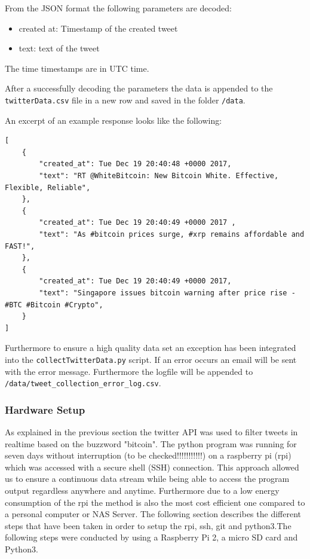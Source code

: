 \documentclass[a4paper,12pt]{article}
\begin{document}
\begin{spacing}{1.2}
From the JSON format the following parameters are decoded:
\begin{itemize}
    \item created at: Timestamp of the created tweet
    \item text: text of the tweet
\end{itemize}
The time timestamps are in UTC time.

After a successfully decoding the parameters the data is appended to the \verb|twitterData.csv| file in a new row and saved in the folder \verb|/data|.

An excerpt of an example response looks like the following:
\begin{lstlisting}
[
    {
        "created_at": Tue Dec 19 20:40:48 +0000 2017, 
        "text": "RT @WhiteBitcoin: New Bitcoin White. Effective, Flexible, Reliable", 
    }, 
    {
        "created_at": Tue Dec 19 20:40:49 +0000 2017 ,
        "text": "As #bitcoin prices surge, #xrp remains affordable and FAST!",
    }, 
    {
        "created_at": Tue Dec 19 20:40:49 +0000 2017, 
        "text": "Singapore issues bitcoin warning after price rise - #BTC #Bitcoin #Crypto", 
    }
]
\end{lstlisting}

Furthermore to ensure a high quality data set an exception has been integrated into the \verb|collectTwitterData.py| script. If an error occurs an email will be sent with the error message. Furthermore the logfile will be  appended to \verb|/data/tweet_collection_error_log.csv|.

\subsubsection{Hardware Setup}
As explained in the previous section the twitter API was used to filter tweets in realtime based on the buzzword "bitcoin". The python program was running for seven days without interruption (to be checked!!!!!!!!!!!) on a raspberry pi (rpi) which was accessed with a secure shell (SSH) connection. This approach allowed us to ensure a continuous data stream while being able to access the program output regardless anywhere and anytime. Furthermore due to a low energy consumption of the rpi the method is also the most cost efficient one compared to a personal computer or NAS Server. The following section describes the different steps that have been taken in order to setup the rpi, ssh, git and python3.\newline The following steps were conducted by using a Raspberry Pi 2, a micro SD card and Python3.



\end{spacing}
\end{document}
